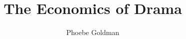 \title{The Economics of Drama}
\author{Phoebe Goldman}
\date{}

\newcommand{\theprof}{Prof. John Osburn}
\newcommand{\theclass}{History of Drama and Theater 1}
